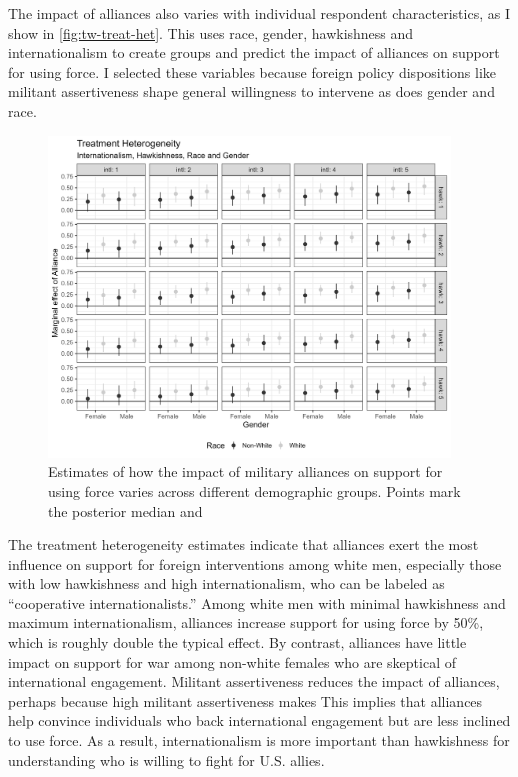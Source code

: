\documentclass[12pt]{article}
\begin{document}
The impact of alliances also varies with individual respondent characteristics, as I show in \autoref{fig:tw-treat-het}. 
This uses race, gender, hawkishness and internationalism to create groups and predict the impact of alliances on support for using force. 
I selected these variables because foreign policy dispositions like militant assertiveness shape general willingness to intervene \citep{Kertzeretal2014} as does gender \citep{Barnhartetal2020} and race. 


\begin{figure}[htpb]
	\centering
		\includegraphics[width=0.95\textwidth]{../figures/tw-treat-het.png}
	\caption{Estimates of how the impact of military alliances on support for using force varies across different demographic groups. Points mark the posterior median and }
	\label{fig:tw-treat-het}
\end{figure}


The treatment heterogeneity estimates indicate that alliances exert the most influence on support for foreign interventions among white men, especially those with low hawkishness and high internationalism, who can be labeled as ``cooperative internationalists.'' 
Among white men with minimal hawkishness and maximum internationalism, alliances increase support for using force by 50\%, which is roughly double the typical effect. 
By contrast, alliances have little impact on support for war among non-white females who are skeptical of international engagement.
Militant assertiveness reduces the impact of alliances, perhaps because high militant assertiveness makes  
This implies that alliances help convince individuals who back international engagement but are less inclined to use force. 
As a result, internationalism is more important than hawkishness for understanding who is willing to fight for U.S. allies. 
\end{document}
